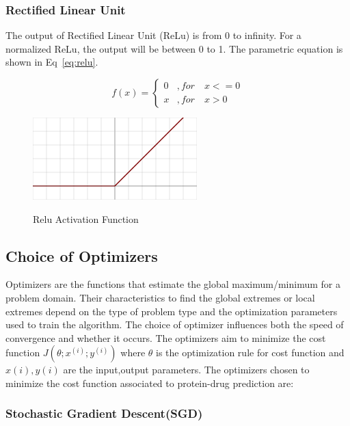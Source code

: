   \subsubsection{Rectified Linear Unit}
  The output of Rectified Linear Unit (ReLu) is from 0 to infinity. For a normalized ReLu, the output will be between 0 to 1. The parametric equation is shown in Eq~\ref{eq:relu}.

  
  \begin{equation}
    f(x) = 
      \begin{cases}
        0 & ,for \quad x <= 0 \\
        x & ,for \quad x > 0
      \end{cases}
      \label{eq:relu}
  \end{equation}

  \begin{figure}
    \centering
      \includegraphics[width=.45\textwidth]{mainmatter/3-Methodology/images/relu.png}
    \label{fig:relu}
    \caption{Relu Activation Function}
  \end{figure}

   
  \subsection{Choice of Optimizers}

  Optimizers are the functions that estimate the global maximum/minimum for a problem domain. Their characteristics to find the global extremes or local extremes depend on the type of problem type and the optimization parameters used to train the algorithm. The choice of optimizer influences both the speed of convergence and whether it occurs. 
  The optimizers aim to minimize the cost function $ J( \theta; x^{(i)}; y^{(i)}) $ where $\theta$ is the optimization rule for cost function and $x{(i)},y{(i)}$ are the input,output parameters. The optimizers chosen to minimize the cost function associated to protein-drug prediction are:
  
  \subsubsection{Stochastic Gradient Descent(SGD)}

